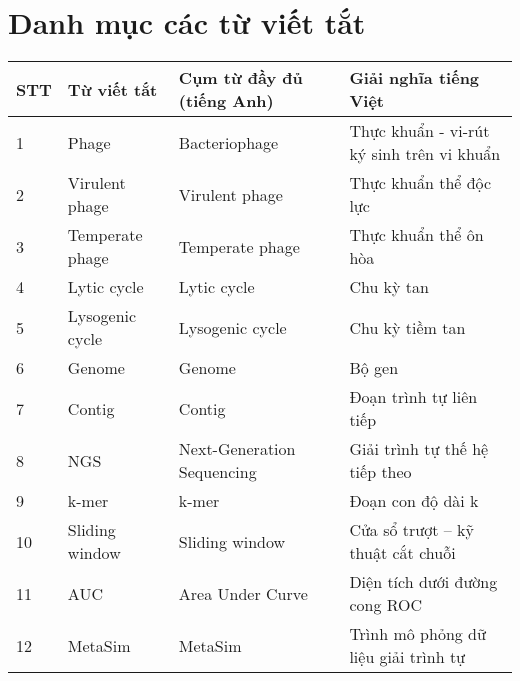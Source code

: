 \chapter*{Danh mục các từ viết tắt}
 
\begin{tabular}{|m{1cm}|m{3cm}|m{4cm}|m{6cm}|}
    \hline
\textbf{STT} & \textbf{Từ viết tắt} & \textbf{Cụm từ đầy đủ (tiếng Anh)} & \textbf{Giải nghĩa tiếng Việt} \\
\hline
1 & Phage & Bacteriophage & Thực khuẩn - vi-rút ký sinh trên vi khuẩn \\
\hline
2 & Virulent phage & Virulent phage & Thực khuẩn thể độc lực \\
\hline
3 & Temperate phage & Temperate phage & Thực khuẩn thể ôn hòa \\
\hline
4 & Lytic cycle & Lytic cycle & Chu kỳ tan \\
\hline
5 & Lysogenic cycle & Lysogenic cycle & Chu kỳ tiềm tan \\
\hline
6 & Genome & Genome & Bộ gen \\
\hline
7 & Contig & Contig & Đoạn trình tự liên tiếp \\
\hline
8 & NGS & Next-Generation Sequencing & Giải trình tự thế hệ tiếp theo \\
\hline
9 & k-mer & k-mer & Đoạn con độ dài k \\
\hline
10 & Sliding window & Sliding window & Cửa sổ trượt – kỹ thuật cắt chuỗi \\
\hline
11 & AUC & Area Under Curve & Diện tích dưới đường cong ROC \\
\hline
12 & MetaSim & MetaSim & Trình mô phỏng dữ liệu giải trình tự \\
\hline
\end{tabular}

